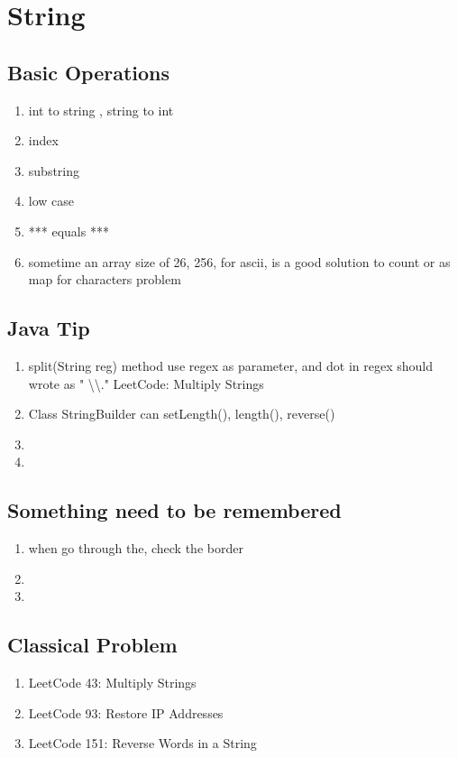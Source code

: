 \chapter{ String }

\section{ Basic Operations  }



\begin{enumerate}
    \item int to string , string to int
    \item index
    \item substring
    \item low case
    \item *** equals ***
    \item sometime an array size of 26, 256, for ascii, is a good solution to count or as map for characters problem



\end{enumerate}

\section{ Java Tip }

 \begin{enumerate}
    \item split(String reg) method use regex as parameter, and dot in regex should wrote as " \textbackslash \textbackslash ." LeetCode: Multiply Strings

    \item Class StringBuilder can setLength(), length(), reverse()

    

    \item

    \item

\end{enumerate}

\section{ Something need to be remembered }

\begin{enumerate}
    \item  when go through the, check the border 
    \item  
    \item  

\end{enumerate}


\section{ Classical Problem }

\begin{enumerate}
    \item LeetCode 43: Multiply Strings
    \item LeetCode 93: Restore IP Addresses
    \item LeetCode 151: Reverse Words in a String

\end{enumerate}

